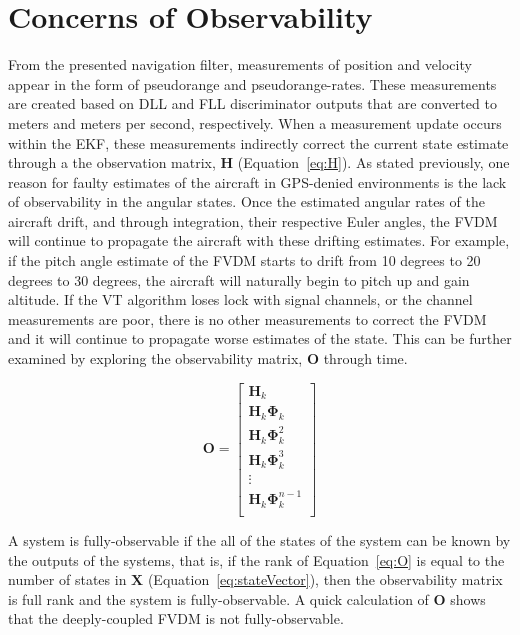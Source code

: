 \section{\textbf{Concerns of Observability}}

From the presented navigation filter, measurements of position and velocity appear in the form of pseudorange and pseudorange-rates. These measurements are created based on DLL and FLL discriminator outputs that are converted to meters and meters per second, respectively. When a measurement update occurs within the EKF, these measurements indirectly correct the current state estimate through a the observation matrix, \(\mathbf{H}\) (Equation~\ref{eq:H}). As stated previously, one reason for faulty estimates of the aircraft in GPS-denied environments is the lack of observability in the angular states. Once the estimated angular rates of the aircraft drift, and through integration, their respective Euler angles, the FVDM will continue to propagate the aircraft with these drifting estimates. For example, if the pitch angle estimate of the FVDM starts to drift from 10 degrees to 20 degrees to 30 degrees, the aircraft will naturally begin to pitch up and gain altitude. If the VT algorithm loses lock with signal channels, or the channel measurements are poor, there is no other measurements to correct the FVDM and it will continue to propagate worse estimates of the state. This can be further examined by exploring the observability matrix, \(\mathbf{O}\) through time.

\begin{equation}\label{eq:O}
    \mathbf{O} = \begin{bmatrix}
        \mathbf{H}_k                    \\
        \mathbf{H}_k\mathbf{\Phi}_k       \\
        \mathbf{H}_k\mathbf{\Phi}_k^2     \\
        \mathbf{H}_k\mathbf{\Phi}_k^3     \\
        \vdots                        \\
        \mathbf{H}_k\mathbf{\Phi}_k^{n-1} \\
    \end{bmatrix}
\end{equation}

A system is fully-observable if the all of the states of the system can be known by the outputs of the systems, that is, if the rank of Equation~\ref{eq:O} is equal to the number of states in \(\mathbf{X}\) (Equation~\ref{eq:stateVector}), then the observability matrix is full rank and the system is fully-observable. A quick calculation of \(\mathbf{O}\) shows that the deeply-coupled FVDM is not fully-observable. 


